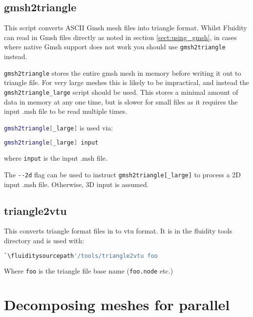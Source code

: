 \subsection{gmsh2triangle}

This script converts ASCII Gmsh mesh files into triangle format. Whilst Fluidity
can read in Gmsh files directly as noted in section \ref{sect:using_gmsh}, in
cases where native Gmsh support does not work you should use 
\lstinline[language = Bash]+gmsh2triangle+ instead.


\lstinline[language=Bash]{gmsh2triangle} stores the entire gmsh mesh in memory before writing it out to
triangle file. For very large meshes this is likely to be impractical,
and instead the \lstinline[language=Bash]{gmsh2triangle_large} script
should be used. This stores a minimal amount of data in memory at 
any one time, but is slower for small files as it requires the 
input .msh file to be read multiple times.

\lstinline[language=Bash]{gmsh2triangle[_large]} is used via:

\begin{lstlisting}[language = Bash]
gmsh2triangle[_large] input
\end{lstlisting}

where \lstinline[language = Bash]*input* is the input .msh file.

The \lstinline[language = Bash]+--2d+ flag can be used to instruct \lstinline+gmsh2triangle[_large]+
to process a 2D input .msh file. Otherwise, 3D input is assumed.

\subsection{triangle2vtu}
This converts triangle format files in to vtu format. It is in the fluidity tools directory and is used with:

\begin{lstlisting}[language = Bash]
`\fluiditysourcepath'/tools/triangle2vtu foo
\end{lstlisting}

Where \lstinline+foo+ is the triangle file base name (\lstinline+foo.node+ etc.)

\section{Decomposing meshes for parallel}
\label{decomp_meshes_parallel}

